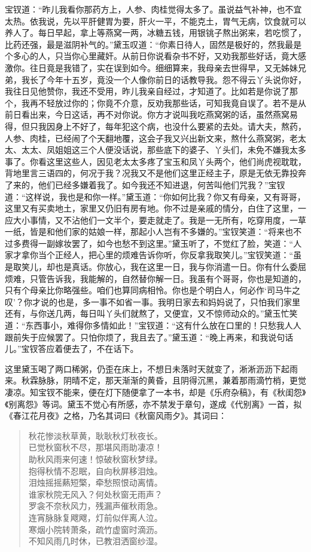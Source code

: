 \documentclass[12pt,oneside]{book}
\newenvironment{shici}{%
\begin{verse}%
\centering\large\hspace{12pt}}%
{\end{verse}}
\begin{document}
宝钗道：“昨儿我看你那药方上，人参、肉桂觉得太多了。虽说益气补神，也不宜太热。依我说，先以平肝健胃为要，肝火一平，不能克土，胃气无病，饮食就可以养人了。每日早起，拿上等燕窝一两，冰糖五钱，用银铫子熬出粥来，若吃惯了，比药还强，最是滋阴补气的。”黛玉叹道：“你素日待人，固然是极好的，然我最是个多心的人，只当你心里藏奸。从前日你说看杂书不好，又劝我那些好话，竟大感激你。往日竟是我错了，实在误到如今。细细算来，我母亲去世得早，又无姊妹兄弟，我长了今年十五岁，竟没一个人像你前日的话教导我。怨不得云丫头说你好，我往日见他赞你，我还不受用，昨儿我亲自经过，才知道了。比如若是你说了那个，我再不轻放过你的；你竟不介意，反劝我那些话，可知我竟自误了。若不是从前日看出来，今日这话，再不对你说。你方才说叫我吃燕窝粥的话，虽然燕窝易得，但只我因身上不好了，每年犯这个病，也没什么要紧的去处。请大夫，熬药，人参、肉桂，已经闹了个天翻地覆，这会子我又兴出新文来，熬什么燕窝粥，老太太、太太、凤姐姐这三个人便没话说，那些底下的婆子、丫头们，未免不嫌我太多事了。你看这里这些人，因见老太太多疼了宝玉和凤丫头两个，他们尚虎视耽耽，背地里言三语四的，何况于我？况我又不是他们这里正经主子，原是无依无靠投奔了来的，他们已经多嫌着我了。如今我还不知进退，何苦叫他们咒我？”宝钗道：“这样说，我也是和你一样。”黛玉道：“你如何比我？你又有母亲，又有哥哥，这里又有买卖地土，家里又仍旧有房有地。你不过是亲戚的情分，白住了这里，一应大小事情，又不沾他们一文半个，要走就走了。我是一无所有，吃穿用度，一草一纸，皆是和他们家的姑娘一样，那起小人岂有不多嫌的。”宝钗笑道：“将来也不过多费得一副嫁妆罢了，如今也愁不到这里。”黛玉听了，不觉红了脸，笑道：“人家才拿你当个正经人，把心里的烦难告诉你听，你反拿我取笑儿。”宝钗笑道：“虽是取笑儿，却也是真话。你放心，我在这里一日，我与你消遣一日。你有什么委屈烦难，只管告诉我，我能解的，自然替你解一日。我虽有个哥哥，你也是知道的，只有个母亲比你略强些。咱们也算同病相怜。你也是个明白人，何必作‘司马牛之叹’？你才说的也是，多一事不如省一事。我明日家去和妈妈说了，只怕我们家里还有，与你送几两，每日叫丫头们就熬了，又便宜，又不惊师动众的。”黛玉忙笑道：“东西事小，难得你多情如此！”宝钗道：“这有什么放在口里的！只愁我人人跟前失于应候罢了。只怕你烦了，我且去了。”黛玉道：“晚上再来，和我说句话儿。”宝钗答应着便去了，不在话下。

这里黛玉喝了两口稀粥，仍歪在床上，不想日未落时天就变了，淅淅沥沥下起雨来。秋霖脉脉，阴晴不定，那天渐渐的黄昏，且阴得沉黑，兼着那雨滴竹梢，更觉凄凉。知宝钗不能来，便在灯下随便拿了一本书，却是《乐府杂稿》，有《秋闺怨》《别离怨》等词。黛玉不觉心有所感，亦不禁发于章句，遂成《代别离》一首，拟《春江花月夜》之格，乃名其词曰《秋窗风雨夕》。其词曰：

\begin{shici}
秋花惨淡秋草黄，耿耿秋灯秋夜长。\\
已觉秋窗秋不尽，那堪风雨助凄凉！\\
助秋风雨来何速！惊破秋窗秋梦绿。\\
抱得秋情不忍眠，自向秋屏移泪烛。\\
泪烛摇摇爇短檠，牵愁照恨动离情。\\
谁家秋院无风入？何处秋窗无雨声？\\
罗衾不奈秋风力，残漏声催秋雨急。\\
连宵脉脉复飕飕，灯前似伴离人泣。\\
寒烟小院转萧条，疏竹虚窗时滴沥。\\
不知风雨几时休，已教泪洒窗纱湿。
\end{shici}
\end{document}
